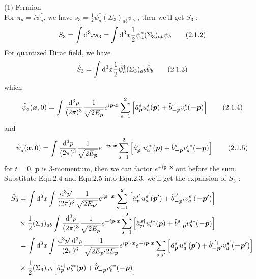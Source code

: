 \documentclass[12pt]{article}
\begin{document}
\begin{spacing}{1.5}
(1) Fermion \\
For $\pi_{a}=i\psi^{*}_{a}$, we have $\displaystyle s_{3}=\frac{1}{2}\psi^{*}_{a}(\Sigma_{3})_{ab}\psi_{b}$ , then we'll get $S_{3}$ :
\begin{equation}
\displaystyle 
S_{3}=\int\mathop{}\!\mathrm{d}^{3}xs_{3}=\int\mathop{}\!\mathrm{d}^{3}x\frac{1}{2}\psi^{*}_{a}(\Sigma_{3})_{ab}\psi_{b}
	\tag{2.1.2}
\end{equation}
For quantized Dirac field, we have
\begin{equation}
\displaystyle 
\hat S_{3}=\int\mathop{}\!\mathrm{d}^{3}x\frac{1}{2}\hat\psi^{\dagger}_{a}(\Sigma_{3})_{ab}\hat\psi_{b}
	\tag{2.1.3}
\end{equation}
which
\begin{equation}
\displaystyle 
\hat\psi_{a}(\bm x,0)=\int \frac{\mathop{}\!\mathrm{d}^{3} p}{(2\pi)^{3}}\frac{1}{\sqrt{2E_{\bm p}}}e^{i\bm p \cdot \bm x}\sum\limits_{s=1}^{2}\left[\hat a^{s}_{\bm p}u^{s}_{a}(\bm p)+\hat b^{s\dagger}_{\bm{-p}}v^{s}_{a}(\bm{-p})\right]
	\tag{2.1.4}
\end{equation}
and
\begin{equation}
\displaystyle 
\hat\psi^{\dagger}_{a}(\bm x,0)=\int \frac{\mathop{}\!\mathrm{d}^{3} p}{(2\pi)^{3}}\frac{1}{\sqrt{2E_{\bm p}}}e^{-i\bm p \cdot \bm x}\sum\limits_{s=1}^{2}\left[\hat a^{s\dagger}_{\bm p}u^{s*}_{a}(\bm p)+\hat b^{s}_{\bm{-p}}v^{s*}_{a}(\bm{-p})\right]
	\tag{2.1.5}
\end{equation}
for $t=0$, $\bm p$ is 3-momentum, then we can factor $e^{\pm i\bm p \cdot \bm x}$ out before the sum.\\
Substitute  Equ.2.4 and Equ.2.5 into Equ.2.3, we'll get the expansion of $S_{3}$ :	%
\begin{equation}
\begin{aligned}	
\hat S_{3} &= \int\dif^{3}x \int \frac{\dif^{3} p'}{(2\pi)^{3}}\frac{1}{\sqrt{2E_{\bm p'}}}e^{i\bm p' \cdot \bm x}\sum\limits_{s'=1}^{2}\left[\hat a^{s'}_{\bm p}u^{s'}_{a}(\bm p')+\hat b^{s'\dagger}_{\bm{-p'}}v^{s'}_{a}(\bm{-p'})\right] \\ & \times \frac{1}{2}(\Sigma_{3})_{ab} \int \frac{\dif^{3} p}{(2\pi)^{3}}\frac{1}{\sqrt{2E_{\bm p}}}e^{-i\bm p \cdot \bm x}\sum\limits_{s=1}^{2}\left[\hat a^{s\dagger}_{\bm p}u^{s*}_{b}(\bm p)+\hat b^{s}_{\bm{-p}}v^{s*}_{b}(\bm{-p})\right]\\
&= \int\dif^{3}x \int \frac{\dif^{3} p'\dif^{3} p}{(2\pi)^{6}}\frac{1}{\sqrt{2E_{\bm p'}2E_{\bm p}}} e^{i\bm p' \cdot \bm x} e^{-i\bm p \cdot \bm x} \sum\limits_{s,s'}\left[\hat a^{s'}_{\bm p}u^{s'}_{a}(\bm p')+\hat b^{s'\dagger}_{\bm{-p'}}v^{s'}_{a}(\bm{-p'})\right]\\ & \times \frac{1}{2}(\Sigma_{3})_{ab} \left[\hat a^{s\dagger}_{\bm p}u^{s*}_{b}(\bm p)+\hat b^{s}_{\bm{-p}}v^{s*}_{b}(\bm{-p})\right] \\

\end{aligned}
\end{equation}
\end{spacing}
\end{document}

